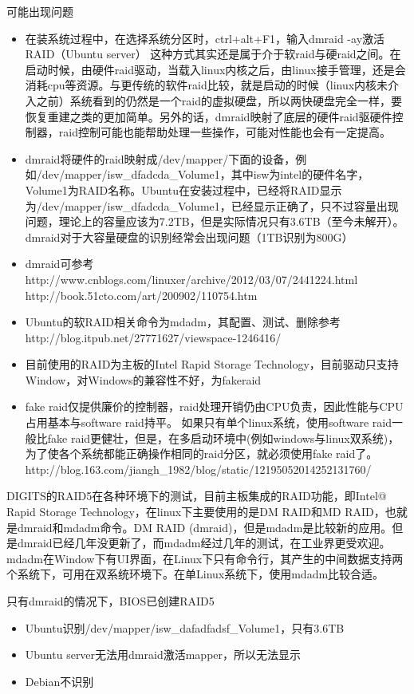 可能出现问题
\begin{itemize}
\item 在装系统过程中，在选择系统分区时，ctrl+alt+F1，输入dmraid -ay激活RAID（Ubuntu server） 这种方式其实还是属于介于软raid与硬raid之间。在启动时候，由硬件raid驱动，当载入linux内核之后，由linux接手管理，还是会消耗cpu等资源。与更传统的软件raid比较，就是启动的时候（linux内核未介入之前）系统看到的仍然是一个raid的虚拟硬盘，所以两快硬盘完全一样，要恢复重建之类的更加简单。另外的话，dmraid映射了底层的硬件raid驱硬件控制器，raid控制可能也能帮助处理一些操作，可能对性能也会有一定提高。 
\item dmraid将硬件的raid映射成/dev/mapper/下面的设备，例如/dev/mapper/isw\_dfadcda\_Volume1，其中isw为intel的硬件名字，Volume1为RAID名称。Ubuntu在安装过程中，已经将RAID显示为/dev/mapper/isw\_dfadcda\_Volume1，已经显示正确了，只不过容量出现问题，理论上的容量应该为7.2TB，但是实际情况只有3.6TB（至今未解开）。dmraid对于大容量硬盘的识别经常会出现问题（1TB识别为800G）
\item dmraid可参考http://www.cnblogs.com/linuxer/archive/2012/03/07/2441224.html
http://book.51cto.com/art/200902/110754.htm
\item Ubuntu的软RAID相关命令为mdadm，其配置、测试、删除参考http://blog.itpub.net/27771627/viewspace-1246416/
\item 目前使用的RAID为主板的Intel Rapid Storage Technology，目前驱动只支持Window，对Windows的兼容性不好，为fakeraid
\item fake raid仅提供廉价的控制器，raid处理开销仍由CPU负责，因此性能与CPU占用基本与software raid持平。 如果只有单个linux系统，使用software raid一般比fake raid更健壮，但是，在多启动环境中(例如windows与linux双系统)，为了使各个系统都能正确操作相同的raid分区，就必须使用fake raid了。 http://blog.163.com/jiangh_1982/blog/static/12195052014252131760/
\end{itemize}

DIGITS的RAID5在各种环境下的测试，目前主板集成的RAID功能，即Intel@ Rapid Storage Technology，在linux下主要使用的是DM RAID和MD RAID，也就是dmraid和mdadm命令。DM RAID (dmraid)，但是mdadm是比较新的应用。但是dmraid已经几年没更新了，而mdadm经过几年的测试，在工业界更受欢迎。mdadm在Window下有UI界面，在Linux下只有命令行，其产生的中间数据支持两个系统下，可用在双系统环境下。在单Linux系统下，使用mdadm比较合适。

只有dmraid的情况下，BIOS已创建RAID5
\begin{itemize}
\item Ubuntu识别/dev/mapper/isw_dafadfadsf_Volume1，只有3.6TB 
\item Ubuntu server无法用dmraid激活mapper，所以无法显示
\item Debian不识别
\end{itemize}

